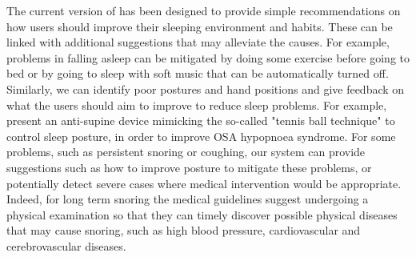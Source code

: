  The current version of {\systemname} has been designed to provide simple recommendations on how users
should improve their sleeping environment and habits. These can be linked with additional suggestions that may alleviate the causes. For
example, problems in falling asleep can be mitigated by doing some exercise before going to bed or by going to sleep with soft music that
can be automatically turned off. Similarly, we can identify poor postures and hand positions and give feedback on what the users should aim
to improve to reduce sleep problems. For example, \cite{posture} present an anti-supine device mimicking the so-called "tennis ball
technique" to control sleep posture, in order to improve OSA hypopnoea syndrome.  For some problems, such as persistent snoring or
coughing, our system can provide suggestions such as how to improve posture to mitigate these problems, or potentially detect severe cases
where medical intervention would be appropriate. Indeed, for long term snoring the medical guidelines suggest undergoing a physical
examination so that they can timely discover possible physical diseases that may cause snoring, such as high blood pressure, cardiovascular
and cerebrovascular diseases.
